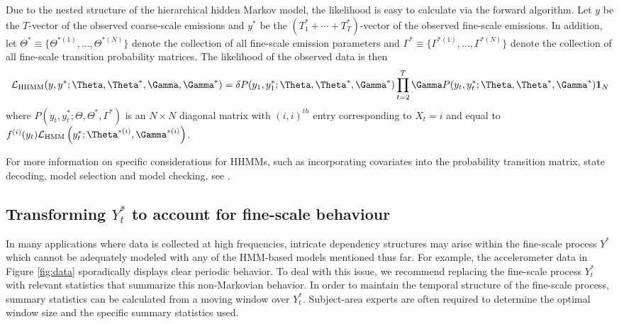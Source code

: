 Due to the nested structure of the hierarchical hidden Markov model, the likelihood is easy to calculate via the forward algorithm.
%
Let $y$ be the $T$-vector of the observed coarse-scale emissions and
$y^*$ be the $(T_1^* + \cdots + T_T^*)$-vector of the observed fine-scale emissions.
%
In addition, let $\Theta^* \equiv \{\Theta^{*(1)}, \ldots, \Theta^{*(N)}\}$ denote the collection of all fine-scale emission parameters and $\Gamma^* \equiv \{\Gamma^{*(1)}, \ldots, \Gamma^{*(N)}\}$ denote the collection of all fine-scale transition probability matrices. The likelihood of the observed data is then
%
\[
\calL_{\text{HHMM}}(y,y^*;\Theta,\Theta^*,\Gamma,\Gamma^*) = \delta P(y_1,y_1^*;\Theta,\Theta^*,\Gamma^*) \prod_{t=2}^T \Gamma P(y_t,y_t^*;\Theta,\Theta^*,\Gamma^*) \mathbf{1}_N
\]
%
where $P(y_t,y_t^*;\Theta,\Theta^*,\Gamma^*)$ is an $N \times N$ diagonal matrix with $(i,i)^{th}$ entry corresponding to $X_t=i$ and equal to 
$f^{(i)}(y_t)\calL_{\text{HMM}}\left(y_t^*;\Theta^{*(i)},
\Gamma^{*(i)}\right)$. 

For more information on specific considerations for HHMMs, such as incorporating covariates into the probability transition matrix, state decoding, model selection and model checking, see \citet{Adam:2019}.

\subsection{Transforming $Y_t^*$ to account for fine-scale behaviour}
\label{subsec:STFT}

In many applications where data is collected at high frequencies, intricate dependency structures may arise within the fine-scale process $Y^*$ which cannot be adequately modeled with any of the HMM-based models mentioned thus far. For example, the accelerometer data in Figure \ref{fig:data} sporadically displays clear periodic behavior. To deal with this issue, we recommend replacing the fine-scale process $Y_t^*$ with relevant statistics that summarize this non-Markovian behavior. In order to maintain the temporal structure of the fine-scale process, summary statistics can be calculated from a moving window over $Y_t^*$. Subject-area experts are often required to determine the optimal window size and the specific summary statistics used. 


